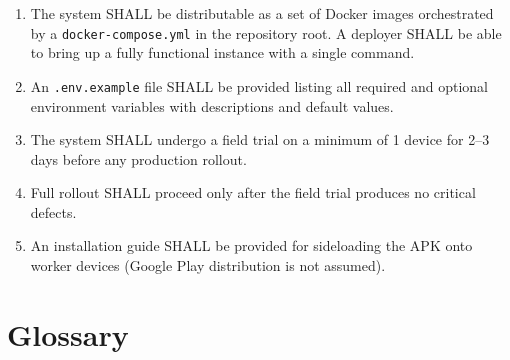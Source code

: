 \documentclass[12pt, a4paper]{article}
\begin{document}
\begin{enumerate}
    \item The system SHALL be distributable as a set of Docker images
          orchestrated by a \texttt{docker-compose.yml} in the repository
          root. A deployer SHALL be able to bring up a fully functional
          instance with a single command.
    \item An \texttt{.env.example} file SHALL be provided listing all
          required and optional environment variables with descriptions
          and default values.
    \item The system SHALL undergo a field trial on a minimum of 1 device
          for 2--3 days before any production rollout.
    \item Full rollout SHALL proceed only after the field trial produces
          no critical defects.
    \item An installation guide SHALL be provided for sideloading the APK
          onto worker devices (Google Play distribution is not assumed).
\end{enumerate}


\newpage
\appendix

\section{Glossary}
\label{app:glossary}
\end{document}
